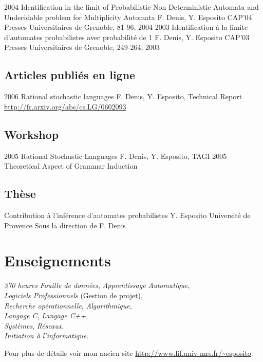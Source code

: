 \article
{2004}
{Identification in the limit of Probabilistic Non Deterministic Automata and Undecidable problem for Multiplicity Automata}
{F. Denis, Y. Esposito}
{CAP'04}
{Presses Universitaires de Grenoble, 81-96, 2004}
\article
{2003}
{Identification à la limite d'automates probabilistes avec probabilité de 1}
{F. Denis, Y. Esposito}
{CAP'03}
{Presses Universitaires de Grenoble, 249-264, 2003}

\subsection*{Articles publiés en ligne}

\article
{2006}
{Rational stochastic languages}
{ F. Denis, Y. Esposito,}
{Technical Report}
{\href{http://fr.arxiv.org/abs/cs.LG/0602093}{\texttt http\string://fr.arxiv.org/abs/cs.LG/0602093}}

\subsection*{Workshop}

\article
{2005}
{Rational Stochastic Languages}
{F. Denis, Y. Esposito,}
{TAGI 2005}
{Theoretical Aspect of Grammar Induction}

\subsection*{Thèse}
{Contribution à l'inférence d'automates probabilistes}
{Y. Esposito}
{Université de Provence}
{Sous la direction de F. Denis}

\section*{Enseignements}

{\emph{370 heures}}
{\emph{Fouille de données}, \emph{Apprentissage Automatique},\\
\emph{Logiciels Professionnels} (Gestion de projet),\\
\emph{Recherche opérationnelle}, \emph{Algorithmique},\\
\emph{Langage C}, \emph{Langage C++},\\
\emph{Systèmes}, \emph{Réseaux},\\
\emph{Initiation à l'informatique}.
}

\footnotesize{
    Pour plus de détails voir mon ancien site 
    \href{http://www.lif.univ-mrs.fr/~esposito}
    {http://www.lif.univ-mrs.fr/\textasciitilde{}esposito}.
}



